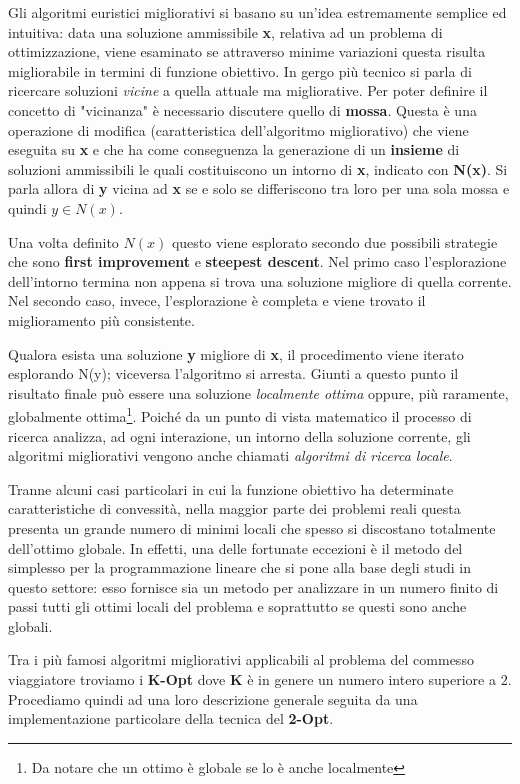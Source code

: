 \documentclass[11pt]{article}
\begin{document}
Gli algoritmi euristici migliorativi si basano su un'idea estremamente semplice ed intuitiva: data una soluzione ammissibile \textbf{x}, relativa ad un problema di ottimizzazione, viene esaminato se attraverso minime variazioni questa risulta migliorabile in termini di funzione obiettivo.
In gergo più tecnico si parla di ricercare soluzioni \textit{vicine} a quella attuale ma migliorative. Per poter definire il concetto di "vicinanza" è necessario discutere quello di \textbf{mossa}. Questa è una operazione di modifica (caratteristica dell'algoritmo migliorativo) che viene eseguita su \textbf{x} e che ha come conseguenza la generazione di un \textbf{insieme} di soluzioni ammissibili le quali costituiscono un intorno di \textbf{x}, indicato con \textbf{N(x)}. Si parla allora di \textbf{y} vicina ad \textbf{x} se e solo se differiscono tra loro per una sola mossa e quindi $y \in N(x)$.

Una volta definito $N(x)$ questo viene esplorato secondo due possibili strategie che sono \textbf{first improvement} e \textbf{steepest descent}. Nel primo caso l'esplorazione dell'intorno termina non appena si trova una soluzione migliore di quella corrente. Nel secondo caso, invece, l'esplorazione è completa e viene trovato il miglioramento più consistente.

Qualora esista una soluzione \textbf{y} migliore di \textbf{x}, il procedimento viene iterato esplorando N(y); viceversa  l'algoritmo si arresta. Giunti a questo punto il risultato finale può essere una soluzione \textit{localmente ottima} oppure, più raramente, globalmente ottima\footnote{Da notare che un ottimo è globale se lo è anche localmente}. Poiché da un punto di vista matematico il processo di ricerca analizza, ad ogni interazione, un intorno della soluzione corrente, gli algoritmi migliorativi vengono anche chiamati \emph{algoritmi di ricerca locale}.

Tranne alcuni casi particolari in cui la funzione obiettivo ha determinate caratteristiche di convessità, nella maggior parte dei problemi reali questa presenta un grande numero di minimi locali che spesso si discostano totalmente dell'ottimo globale. In effetti, una delle fortunate eccezioni è il metodo del simplesso per la programmazione lineare che si pone alla base degli studi in questo settore: esso fornisce sia un metodo per analizzare in un numero finito di passi tutti gli ottimi locali del problema e soprattutto se questi sono anche globali.

Tra i più famosi algoritmi migliorativi applicabili al problema del commesso viaggiatore troviamo i \textbf{K-Opt} dove \textbf{K} è in genere un numero intero superiore a $2$. Procediamo quindi ad una loro descrizione generale seguita da una implementazione particolare della tecnica del \textbf{2-Opt}.
\end{document}
